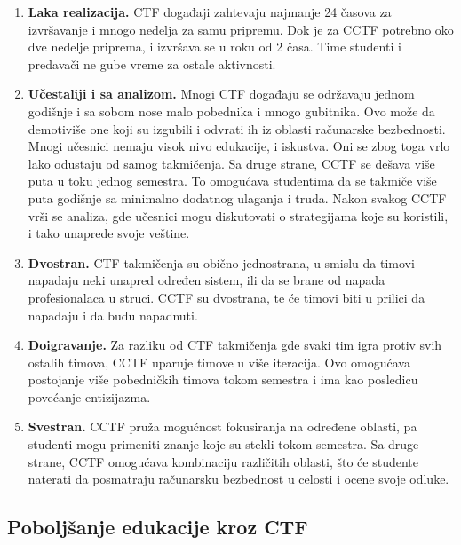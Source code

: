 \documentclass[12pt, a4paper, twocolumn]{article}
\begin{document}
\begin{enumerate}
    \item \textbf{Laka realizacija.} CTF događaji zahtevaju najmanje 24 časova 
        za izvršavanje i mnogo nedelja za samu pripremu. Dok je za CCTF 
        potrebno oko dve nedelje priprema, i izvršava se u roku od 2 časa. 
        Time studenti i predavači ne gube vreme za ostale aktivnosti.
    \item \textbf{Učestaliji i sa analizom.} Mnogi CTF događaju se održavaju
        jednom godišnje i sa sobom nose malo pobednika i mnogo gubitnika.
        Ovo može da demotiviše one koji su izgubili i odvrati ih iz oblasti
        računarske bezbednosti. Mnogi učesnici nemaju visok nivo edukacije,
        i iskustva. Oni se zbog toga vrlo lako odustaju od samog takmičenja.
        Sa druge strane, CCTF se dešava više puta u toku jednog semestra.
        To omogućava studentima da se takmiče više puta godišnje sa minimalno
        dodatnog ulaganja i truda. Nakon svakog CCTF vrši se analiza, gde
        učesnici mogu diskutovati o strategijama koje su koristili, i tako
        unaprede svoje veštine.
    \item \textbf{Dvostran.}
        CTF takmičenja su obično jednostrana, u smislu da timovi napadaju
        neki unapred određen sistem, ili da se brane od napada profesionalaca
        u struci. CCTF su dvostrana, te će timovi biti u prilici da napadaju
        i da budu napadnuti. 
    \item \textbf{Doigravanje.}
        Za razliku od CTF takmičenja gde svaki tim igra protiv svih ostalih
        timova, CCTF uparuje timove u više iteracija. Ovo omogućava postojanje
        više pobedničkih timova tokom semestra i ima kao posledicu povećanje
        entizijazma.
    \item \textbf{Svestran.}
        CCTF pruža mogućnost fokusiranja na određene oblasti, pa studenti
        mogu primeniti znanje koje su stekli tokom semestra. Sa druge strane,
        CCTF omogućava kombinaciju različitih oblasti, što će studente 
        naterati da posmatraju računarsku bezbednost u celosti i ocene
        svoje odluke.
\end{enumerate}

\subsection{Poboljšanje edukacije kroz CTF}
\end{document}
